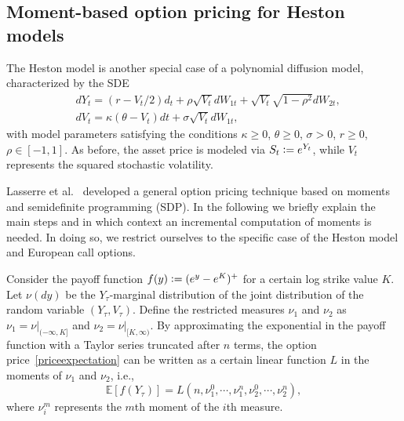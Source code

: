 \subsection{Moment-based option pricing for Heston models} \label{sec:hestonx}

The Heston model is another special case of a polynomial diffusion model, characterized by the SDE 
\begin{align*}
&dY_t=(r-V_t/2)d_t + \rho \sqrt{V_t} dW_{1t}+\sqrt{V_t}\sqrt{1-\rho^2}dW_{2t},\\
&dV_t=\kappa(\theta -V_t)dt+\sigma \sqrt{V_t}dW_{1t},
\end{align*}
with model parameters satisfying the conditions $\kappa \geq 0$, $\theta \geq 0$, $\sigma >0$, $r \geq 0$, $\rho \in [-1,1]$. As before, the asset price is modeled via $S_t \mathrel{\mathop:}= e^{Y_t}$, while $V_t$ represents the squared stochastic volatility.

Lasserre et al.~\cite{Lasserre2006} developed a general option pricing technique based on moments and semidefinite programming (SDP). In the following we briefly explain the main steps and in which context an incremental computation of moments is needed. In doing so, we restrict ourselves to the specific case of the Heston model and European call options.

Consider the payoff function $f(y) \mathrel{\mathop:}= (e^{y}-e^K)^+$ for a certain log strike value $K$. Let $\nu(dy)$ be the $Y_\tau$-marginal distribution of the joint distribution of the random variable $(Y_\tau,V_\tau)$. Define the restricted measures $\nu_1$ and $\nu_2$ as $\nu_1=\nu |_{(- \infty , K]}$ and $\nu_2=\nu |_{[K, \infty)}$. By approximating the exponential in the payoff function with a Taylor series truncated after $n$ terms, the option price~\eqref{priceexpectation} can be written as a certain linear function $L$ in the moments of $\nu_1$ and $\nu_2$, i.e., 
\begin{equation*}
\mathbb{E}[f(Y_\tau)]= L(n,\nu_1^0, \cdots, \nu_1^n,\nu_2^0, \cdots, \nu_2^n),
\end{equation*}
where $\nu_i^m$ represents the $m$th moment of the $i$th measure.\

